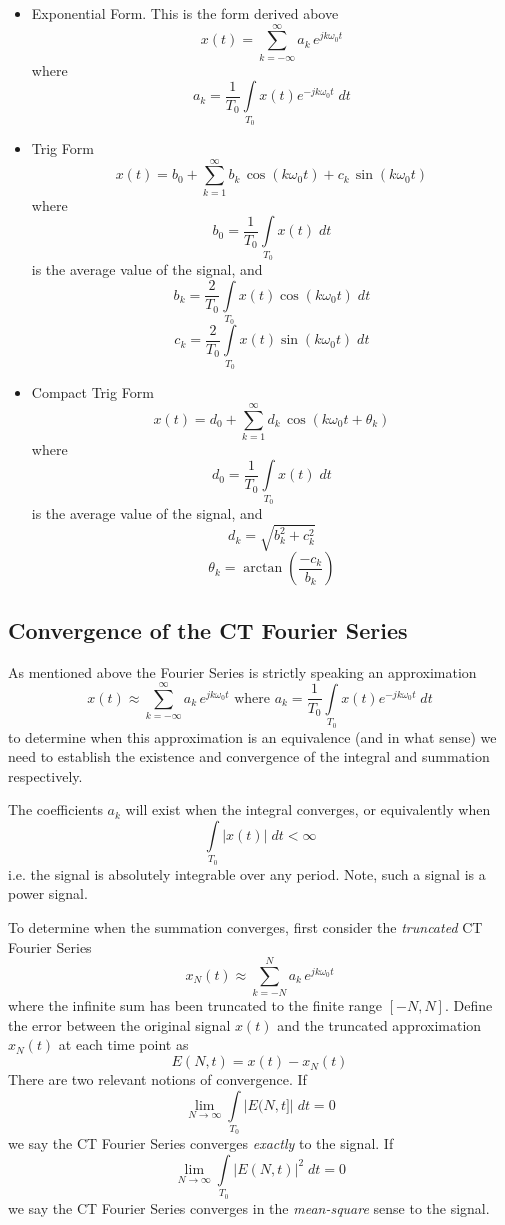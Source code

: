 \begin{itemize}
\item Exponential Form. This is the form derived above
  \[
  x(t) = \sum\limits_{k = -\infty}^{\infty} a_k \, e^{j k\omega_0 t}
  \]
  where 
  \[
  a_k = \frac{1}{T_0} \int\limits_{T_0} x(t)e^{-jk\omega_0 t} \; dt
  \]
\item Trig Form
  \[
  x(t) = b_0 + \sum\limits_{k = 1}^{\infty} b_k \,\cos(k\omega_0 t) + c_k\,\sin(k\omega_0 t) 
  \]
  where
  \[
  b_0 = \frac{1}{T_0} \int\limits_{T_0} x(t) \; dt
  \]
  is the average value of the signal, and
  \[
  b_k = \frac{2}{T_0} \int\limits_{T_0} x(t)\cos(k\omega_0 t) \; dt
  \]
  \[
  c_k = \frac{2}{T_0} \int\limits_{T_0} x(t)\sin(k\omega_0 t) \; dt
  \]
\item Compact Trig Form
  \[
  x(t) = d_0 + \sum\limits_{k = 1}^{\infty} d_k \,\cos(k\omega_0 t + \theta_k) 
  \]
  where
  \[
  d_0 = \frac{1}{T_0} \int\limits_{T_0} x(t) \; dt
  \]
  is the average value of the signal, and
  \[
  d_k = \sqrt{b_k^2 + c_k^2} 
  \]
  \[
  \theta_k = \arctan\left( \frac{-c_k}{b_k} \right)
  \]
\end{itemize}

\subsection{Convergence of the CT Fourier Series}

As mentioned above the Fourier Series is strictly speaking an approximation
\[
x(t) \approx \sum\limits_{k = -\infty}^{\infty} a_k \, e^{j k\omega_0 t} \mbox{ where } a_k = \frac{1}{T_0} \int\limits_{T_0} x(t)e^{-jk\omega_0 t} \; dt
\]
to determine when this approximation is an equivalence (and in what sense) we need to establish the existence and convergence of the integral and summation respectively.

The coefficients $a_k$ will exist when the integral converges, or equivalently when
\[
\int\limits_{T_0} \left|x(t)\right| \; dt < \infty
\]
i.e. the signal is absolutely integrable over any period. Note, such a signal is a power signal.

To determine when the summation converges, first consider the \emph{truncated} CT Fourier Series
\[
x_N(t) \approx \sum\limits_{k = -N}^{N} a_k \, e^{j k\omega_0 t}
\]
where the infinite sum has been truncated to the finite range $[-N,N]$. Define the error between the original signal $x(t)$ and the truncated approximation $x_N(t)$ at each time point as
\[
E(N,t) = x(t) - x_N(t)
\]
There are two relevant notions of convergence. If
\[
\lim_{N\rightarrow \infty} \int\limits_{T_0} \left| E(N,t] \right|\;dt = 0
\]
we say the CT Fourier Series converges \emph{exactly} to the signal. If
\[
\lim_{N\rightarrow \infty} \int\limits_{T_0} \left| E(N,t) \right|^2\;dt = 0
\]
we say the CT Fourier Series converges in the \emph{mean-square} sense to the signal.

